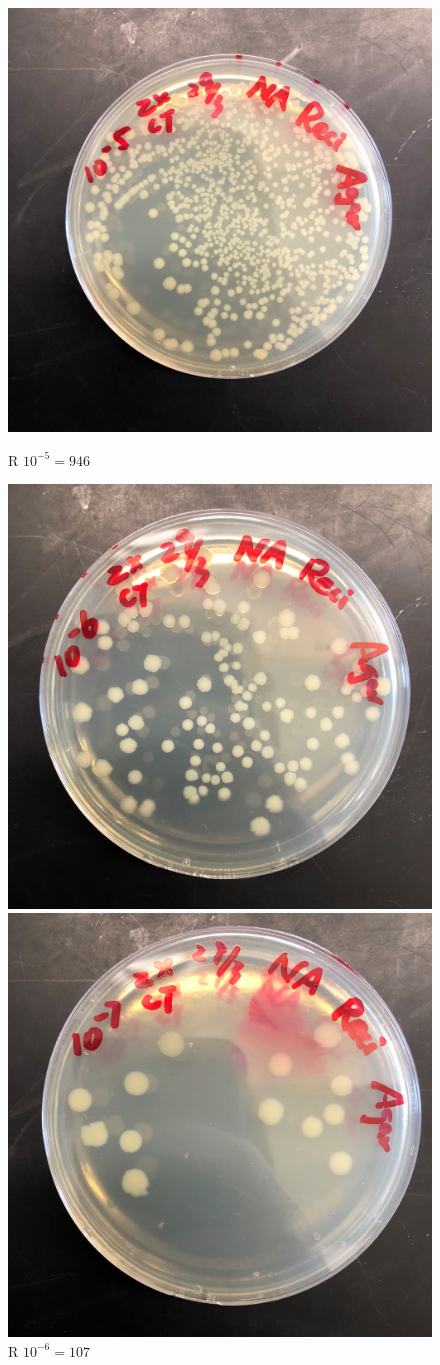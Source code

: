 \documentclass{article}
\begin{document}
			\begin{figure}[H]
				\begin{minipage}[t]{0.32\textwidth}
					\centering
					\includegraphics[width = 0.675\linewidth]{Reci_5_NA.jpg}
					\caption{R $10 ^ {-5} = 946$}
				\end{minipage}
				\begin{minipage}[t]{0.32\textwidth}
					\centering
					\includegraphics[width = 0.675\linewidth]{Reci_6_NA.jpg}
					\caption{R $10 ^{-6} = 107$}
				\end{minipage}
				\begin{minipage}[t]{0.32\textwidth}
					\centering
					\includegraphics[width = 0.675\linewidth]{Reci_7_NA.jpg}

\end{minipage}
\end{figure}
\end{document}

